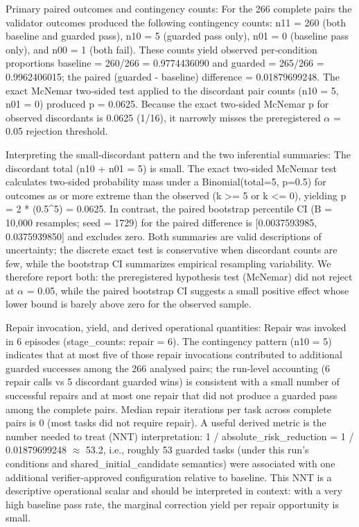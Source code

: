 \documentclass[conference]{IEEEtran}
\begin{document}
Primary paired outcomes and contingency counts: For the 266 complete pairs the validator outcomes produced the following contingency counts: n11 = 260 (both baseline and guarded pass), n10 = 5 (guarded pass only), n01 = 0 (baseline pass only), and n00 = 1 (both fail). These counts yield observed per‑condition proportions baseline = 260/266 = 0.9774436090 and guarded = 265/266 = 0.9962406015; the paired (guarded - baseline) difference = 0.01879699248. The exact McNemar two‑sided test applied to the discordant pair counts (n10 = 5, n01 = 0) produced p = 0.0625. Because the exact two‑sided McNemar p for observed discordants is 0.0625 (1/16), it narrowly misses the preregistered \ensuremath{\alpha} = 0.05 rejection threshold.

Interpreting the small‑discordant pattern and the two inferential summaries: The discordant total (n10 + n01 = 5) is small. The exact two‑sided McNemar test calculates two‑sided probability mass under a Binomial(total=5, p=0.5) for outcomes as or more extreme than the observed (k >= 5 or k <= 0), yielding p = 2 * (0.5\textasciicircum{}5) = 0.0625. In contrast, the paired bootstrap percentile CI (B = 10,000 resamples; seed = 1729) for the paired difference is [0.0037593985, 0.0375939850] and excludes zero. Both summaries are valid descriptions of uncertainty; the discrete exact test is conservative when discordant counts are few, while the bootstrap CI summarizes empirical resampling variability. We therefore report both: the preregistered hypothesis test (McNemar) did not reject at \ensuremath{\alpha} = 0.05, while the paired bootstrap CI suggests a small positive effect whose lower bound is barely above zero for the observed sample.

Repair invocation, yield, and derived operational quantities: Repair was invoked in 6 episodes (stage\_counts: repair = 6). The contingency pattern (n10 = 5) indicates that at most five of those repair invocations contributed to additional guarded successes among the 266 analysed pairs; the run-level accounting (6 repair calls vs 5 discordant guarded wins) is consistent with a small number of successful repairs and at most one repair that did not produce a guarded pass among the complete pairs. Median repair iterations per task across complete pairs is 0 (most tasks did not require repair). A useful derived metric is the number needed to treat (NNT) interpretation: 1 / absolute\_risk\_reduction = 1 / 0.01879699248 \ensuremath{\approx} 53.2, i.e., roughly 53 guarded tasks (under this run's conditions and shared\_initial\_candidate semantics) were associated with one additional verifier‑approved configuration relative to baseline. This NNT is a descriptive operational scalar and should be interpreted in context: with a very high baseline pass rate, the marginal correction yield per repair opportunity is small.
\end{document}
